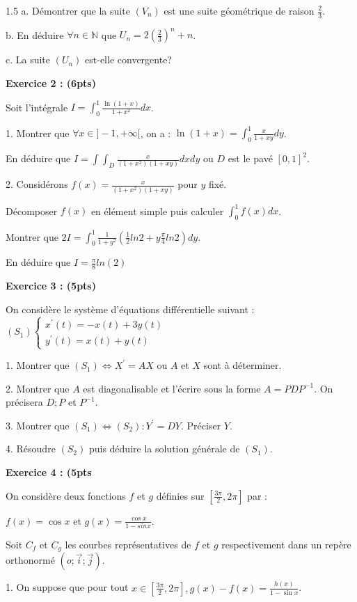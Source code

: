 \documentclass[12pt]{article}
\begin{document}
\begin{spacing}{1.5}
a. Démontrer que la suite $(V_n)$ est une suite géométrique de raison $\frac{2}{3}$.

b. En déduire $\forall {n\in \mathbb{N}}$ que $U_n = 2(\frac{2}{3})^n + n$.

c. La suite $(U_n)$ est-elle convergente?

\textbf{Exercice 2 : (6pts)}

Soit l'intégrale $I=\int_{0}^{1}\frac{\ln(1 + x)}{1 + x^2}dx$.

1. Montrer que $\forall {x\in ]-1,+\infty[}$, on a : $\ln(1+x) = \int_{0}^{1}\frac{x}{1 + xy}dy$.

En déduire que $I = \int\int_D\frac{x}{(1+x^2)(1+xy)}dxdy$ ou  $D$ est le pavé $[0,1]^2$.

2. Considérons $f(x)= \frac{x}{(1+x^2)(1+xy)}$ pour $y$ fixé.

Décomposer $f(x)$ en élément simple puis calculer $\int_{0}^{1}f(x)dx$.

Montrer que $2I = \int_{0}^{1}\frac{1}{1+y^2}(\frac{1}{2}ln2 + y\frac{\pi}{4}ln2)dy$.

En déduire que $I=\frac{\pi}{8}ln(2)$

\medskip
\textbf{Exercice 3 : (5pts)}

On considère le système d'équations différentielle suivant :  $(S_1)\begin{cases}
x^{\prime}(t)=-x(t) + 3 y(t)\\
y^{\prime}(t)=x(t) + y(t)
\end{cases}$

1. Montrer que $(S_1)\Longleftrightarrow X^{\prime} = AX$ ou $A$ et $X$ sont à déterminer.

2. Montrer que $A$ est diagonalisable et l'écrire sous la forme $A=PDP^{-1}$. On précisera $D; P$ et $P^{-1}$.

3. Montrer que $(S_1)\Longleftrightarrow(S_2):Y^{\prime} = DY$. Préciser $Y$.

4. Résoudre $(S_2)$ puis déduire la solution générale de $(S_1)$.

\textbf{Exercice 4 : (5pts}

On considère deux fonctions $f$ et $g$ définies sur $[\frac{3\pi}{2},2\pi]$ par :

$f(x) = \cos x$ et $g(x)=\frac{\cos x}{1 - sin x}$.

Soit $C_f$ et $C_g$ les courbes représentatives de $f$ et $g$ respectivement dans un repère orthonormé $(o;\overrightarrow{i};\overrightarrow{j})$.

1. On suppose que pour tout $x\in [\frac{3\pi}{2},2\pi], g(x) - f(x) = \frac{h(x)}{1-\sin x}$.


\end{spacing}
\end{document}
